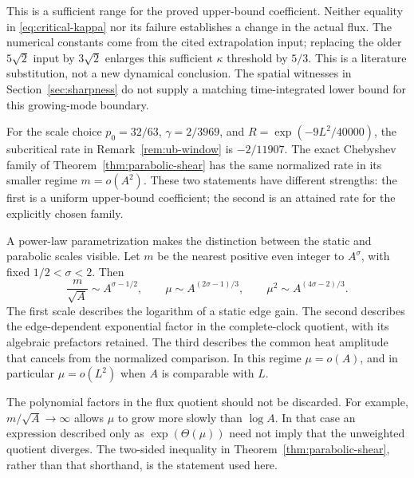 This is a sufficient range for the proved upper-bound coefficient.
Neither equality in \eqref{eq:critical-kappa} nor its failure establishes
a change in the actual flux. The numerical constants come from the cited extrapolation input;
replacing the older $5\sqrt2$ input by $3\sqrt2$ enlarges this
sufficient $\kappa$ threshold by $5/3$. This is a literature substitution,
not a new dynamical conclusion. The spatial witnesses in
Section~\ref{sec:sharpness} do not supply a matching time-integrated
lower bound for this growing-mode boundary.

For the scale choice
\(p_0=32/63\), \(\gamma=2/3969\), and
\(R=\exp(-9L^2/40000)\), the subcritical rate in
Remark~\ref{rem:ub-window} is \(-2/11907\). The exact Chebyshev family
of Theorem~\ref{thm:parabolic-shear} has the same normalized rate in
its smaller regime \(m=o(A^2)\). These two statements have different
strengths: the first is a uniform upper-bound coefficient; the second
is an attained rate for the explicitly chosen family.

A power-law parametrization makes the distinction between the static
and parabolic scales visible. Let \(m\) be the nearest positive even
integer to \(A^\sigma\), with fixed \(1/2<\sigma<2\). Then
\begin{equation}\label{eq:power-law-regimes}
 \frac{m}{\sqrt A}\sim A^{\sigma-1/2},\qquad
 \mu\sim A^{(2\sigma-1)/3},\qquad
 \mu^2\sim A^{(4\sigma-2)/3}.
\end{equation}
The first scale describes the logarithm of a static edge gain.
The second describes the edge-dependent exponential factor in the
complete-clock quotient, with its algebraic prefactors retained.
The third describes the common heat amplitude that cancels from the
normalized comparison. In this regime \(\mu=o(A)\), and in particular
\(\mu=o(L^2)\) when \(A\) is comparable with \(L\).

The polynomial factors in the flux quotient should not be discarded.
For example, \(m/\sqrt A\to\infty\) allows \(\mu\) to grow more slowly
than \(\log A\). In that case an expression described only as
\(\exp(\Theta(\mu))\) need not imply that the unweighted quotient
diverges. The two-sided inequality in
Theorem~\ref{thm:parabolic-shear}, rather than that shorthand, is the
statement used here.
